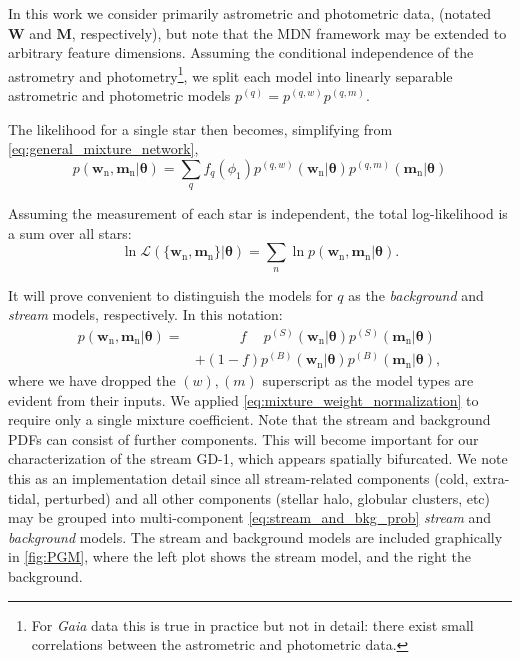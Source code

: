 \documentclass[twocolumn]{aastex631}
\newcommand{\stream}[1]{#1}
\newcommand{\dataarchive}[1]{\textit{#1}}
\newcommand{\Gaia}{\dataarchive{Gaia}}
\newcommand{\mrm}[1]{\mathrm{#1}}
\newcommand{\mbs}[1]{\boldsymbol{#1}}
\newcommand{\mcal}[1]{\mathcal{#1}}
\newcommand{\pdf}{p}
\newcommand{\nth}[1]{{#1}_{\mrm{n}}}  %
\newcommand{\smallcomponent}[2]{#2^{\scriptscriptstyle (#1)}}
\newcommand{\cmp}[2]{\smallcomponent{#1}{#2}}
\newcommand{\Scmp}[1]{\cmp{S}{#1}}
\newcommand{\Bcmp}[1]{\cmp{B}{#1}}
\newcommand{\Spdf}{\Scmp{\pdf}}
\newcommand{\Bpdf}{\Bcmp{\pdf}}
\begin{document}
        In this work we consider primarily astrometric and photometric data,
        (notated $\mbs{W}$ and $\mbs{M}$, respectively), but note that the MDN
        framework may be extended to arbitrary feature dimensions. Assuming the
        conditional independence of the astrometry and photometry\footnote{ For
        \Gaia{} data this is true in practice but not in detail: there exist
        small correlations between the astrometric and photometric data.}, we
        split each model into linearly separable astrometric and photometric
        models $\cmp{q}{\pdf} = \cmp{q,w}{\pdf} \cmp{q,m}{\pdf}$.

        The likelihood for a single star then becomes, simplifying from
        \autoref{eq:general_mixture_network},
        \begin{equation} \label{eq:general_model}
            \!\!\!\!\! \pdf(\nth{\mbs{w}}, \! \nth{\mbs{m}} | \mbs{\theta})
                \!=\! \sum_{q} \! f_q(\phi_1) \cmp{q,w}{\pdf}(\nth{\mbs{w}}|\mbs{\theta}) \cmp{q,m}{\pdf}(\nth{\mbs{m}}|\mbs{\theta})
        \end{equation}

        Assuming the measurement of each star is independent, the total
        log-likelihood is a sum over all stars:
        \begin{equation} \label{eq:general_likelihood}
            \ln\mcal{L}\left(\{\nth{\mbs{w}},\nth{\mbs{m}}\} | \mbs{\theta}\right) = \sum_n \ln \pdf(\nth{\mbs{w}}, \nth{\mbs{m}} | \mbs{\theta}).
        \end{equation}

        It will prove convenient to distinguish the models for $q$ as the
        \textit{background} and \textit{stream} models, respectively. In this
        notation:
        \begin{align} \label{eq:stream_and_bkg_prob}
            \pdf(\nth{\mbs{w}}, \nth{\mbs{m}} | \mbs{\theta})
            =& \phantom{+} \qquad f \phantom{+} \Spdf(\nth{\mbs{w}}|\mbs{\theta}) \Spdf(\nth{\mbs{m}}|\mbs{\theta}) \\
            & + (1-f) \Bpdf(\nth{\mbs{w}}|\mbs{\theta}) \Bpdf(\nth{\mbs{m}}|\mbs{\theta}), \nonumber
        \end{align}
        where we have dropped the $(w), (m)$ superscript as the model types are
        evident from their inputs. We applied
        \autoref{eq:mixture_weight_normalization} to require only a single
        mixture coefficient.  Note that the stream and background PDFs can
        consist of further components. This will become important for our
        characterization of the stream \stream{GD-1}, which appears spatially
        bifurcated. We note this as an implementation detail since all
        stream-related components (cold, extra-tidal, perturbed) and all other
        components (stellar halo, globular clusters, etc) may be grouped into
        multi-component \autoref{eq:stream_and_bkg_prob} \textit{stream} and
        \textit{background} models.  The stream and background models are
        included graphically in \autoref{fig:PGM}, where the left plot shows the
        stream model, and the right the background.
\end{document}
